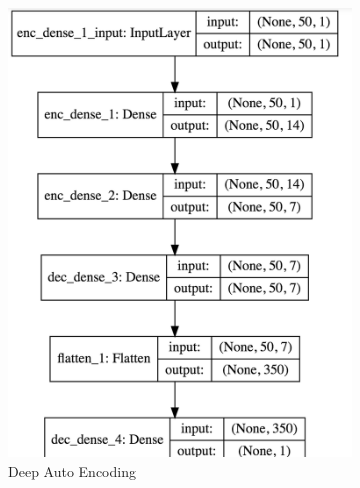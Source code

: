 \documentclass[11pt]{article}
\begin{document}
\begin{figure}
\begin{subfigure}[b]{0.3\textwidth}
        \includegraphics[width=\textwidth]{media/autoenc-network}
        \caption{Deep Auto Encoding}
        \label{fig:autoenc-network}
    \end{subfigure}
    ~ %
    \begin{subfigure}[b]{0.3\textwidth}

\end{subfigure}
\end{figure}
\end{document}
